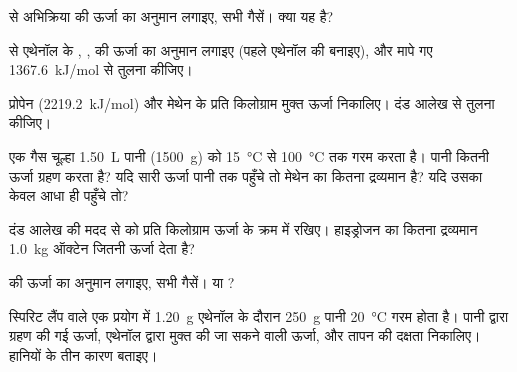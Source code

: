 \begin{exercise}[$\star\star$]\label{exo:g11:reaction-energy:6}
 से अभिक्रिया
 की ऊर्जा का अनुमान लगाइए, सभी गैसें। क्या यह  है?
\end{exercise}

\begin{exercise}[$\star\star$]\label{exo:g11:reaction-energy:7}
 से एथेनॉल के , , की ऊर्जा का अनुमान लगाइए (पहले एथेनॉल की 
बनाइए), और मापे गए \qty{1367.6}{kJ/mol} से तुलना कीजिए।
\end{exercise}

\begin{exercise}[$\star\star$]\label{exo:g11:reaction-energy:8}
प्रोपेन (\qty{2219.2}{kJ/mol}) और मेथेन के प्रति किलोग्राम मुक्त ऊर्जा
निकालिए। दंड आलेख से तुलना कीजिए।
\end{exercise}

\begin{exercise}[$\star\star$]\label{exo:g11:reaction-energy:9}
एक गैस चूल्हा \qty{1.50}{L} पानी (\qty{1500}{g}) को
\qty{15}{\celsius} से \qty{100}{\celsius} तक गरम करता है। पानी कितनी ऊर्जा
ग्रहण करता है? यदि सारी ऊर्जा पानी तक पहुँचे तो मेथेन का कितना द्रव्यमान
 है? यदि उसका केवल आधा ही पहुँचे तो?
\end{exercise}

\begin{exercise}[$\star\star$]\label{exo:g11:reaction-energy:10}
दंड आलेख की मदद से  को प्रति किलोग्राम ऊर्जा के क्रम में रखिए। हाइड्रोजन
का कितना द्रव्यमान \qty{1.0}{kg} ऑक्टेन जितनी ऊर्जा देता है?
\end{exercise}

\begin{exercise}[$\star\star$]\label{exo:g11:reaction-energy:11}
 की ऊर्जा का अनुमान लगाइए, सभी गैसें।  या
?
\end{exercise}

\begin{exercise}[$\star\star\star$]\label{exo:g11:reaction-energy:12}
स्पिरिट लैंप वाले एक प्रयोग में \qty{1.20}{g} एथेनॉल  के दौरान \qty{250}{g} पानी
\qty{20}{\celsius} गरम होता है। पानी द्वारा ग्रहण की गई
ऊर्जा, एथेनॉल द्वारा मुक्त की जा सकने वाली ऊर्जा, और
तापन की दक्षता निकालिए। हानियों के तीन कारण बताइए।
\end{exercise}


